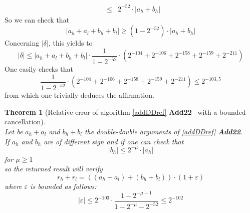 \documentclass[a4paper,10pt,twoside]{article}
\newtheorem{theorem}{Theorem}[section]
\newenvironment{proof}[1][Proof]{\begin{trivlist}
\item[\hskip \labelsep {\bfseries #1}]}{\end{trivlist}}
\newcommand{\qed}{\nobreak \ifvmode \relax \else \ifdim \lastskip<1.5em \hskip-\lastskip
\hskip1.5em plus0em minus0.5em \fi \nobreak \vrule height0.75em width0.5em depth0.25em\fi}
\newcommand{\hi}{\ensuremath{\mathit{h}}}
\newcommand{\lo}{\ensuremath{\mathit{l}}}
\newcommand{\AddDD}{{\bf Add22}}
\renewcommand{\epsilon}{\varepsilon}
\begin{document}
\begin{proof}
\begin{eqnarray*}
& \leq & 2^{-52} \cdot \left \vert a_\hi + b_\hi \right \vert
\end{eqnarray*}
So we can check that
$$\left \vert a_\hi + a_\lo + b_\hi + b_\lo \right \vert \geq \left( 1 - 2^{-52} \right) \cdot \left \vert a_\hi + b_\hi \right \vert$$
Concerning $\left \vert \delta \right \vert$, this yields to
$$\left \vert \delta \right \vert \leq
\left \vert a_\hi + a_\lo + b_\hi + b_\lo \right \vert \cdot \frac{1}{1-2^{-52}} \cdot
\left( 2^{-104} + 2^{-106} + 2^{-158} + 2^{-159} + 2^{-211} \right)$$
One easily checks that
$$ \frac{1}{1-2^{-52}} \cdot \left( 2^{-104} + 2^{-106} + 2^{-158} + 2^{-159} + 2^{-211} \right) \leq 2^{-103,5}$$
from which one trivially deduces the affirmation.\qed
\end{proof}
\begin{theorem}[Relative error of algorithm \ref{addDDref} \AddDD~ with a
    bounded cancellation\label{theoAddDDrefborn}] ~ \\
Let be $a_\hi + a_\lo$ and $b_\hi + b_\lo$ the double-double arguments of \ref{addDDref} \AddDD.\\
If $a_\hi$ and $b_\hi$ are of different sign and if one can check that
$$\left \vert b_\hi \right \vert \leq 2^{-\mu} \cdot \left \vert a_\hi \right
\vert$$ for $\mu \geq 1$ \\
so the returned result will verify
$$r_\hi + r_\lo = \left(\left(a_\hi + a_\lo \right) + \left( b_\hi + b_\lo \right)\right) \cdot \left(1 + \epsilon\right)$$
where $\epsilon$ is bounded as follows:
$$\left \vert \epsilon \right \vert \leq 2^{-103}\cdot \frac{1-2^{-\mu - 1}}{1-2^{-\mu}-2^{-52}} \leq 2^{-102}$$
\end{theorem}
\end{document}
